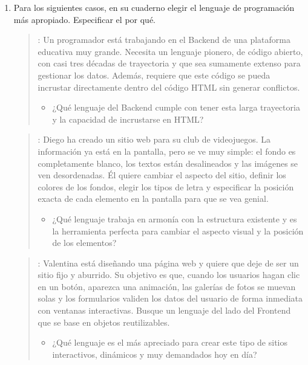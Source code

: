 \documentclass[letterpaper,10pt,spanish]{sphinxmanual}
\begin{document}
\begin{enumerate}
%
\setcounter{enumi}{7}
\item {} 
\sphinxAtStartPar
Para los siguientes casos, en su cuaderno elegir el lenguaje de programación más apropiado. Especificar el por qué.
\begin{quote}

\sphinxAtStartPar
{}: Un programador está trabajando en el Back\sphinxhyphen{}end de una plataforma educativa muy grande. Necesita un lenguaje pionero, de código abierto, con casi tres décadas de trayectoria y que sea sumamente extenso para gestionar los datos. Además, requiere que este código se pueda incrustar directamente dentro del código HTML sin generar conflictos.
\begin{itemize}
\item {} 
\sphinxAtStartPar
¿Qué lenguaje del Back\sphinxhyphen{}end cumple con tener esta larga trayectoria y la capacidad de incrustarse en HTML?

\end{itemize}
\end{quote}
\begin{quote}

\sphinxAtStartPar
{}: Diego ha creado un sitio web para su club de videojuegos. La información ya está en la pantalla, pero se ve muy simple: el fondo es completamente blanco, los textos están desalineados y las imágenes se ven desordenadas. Él quiere cambiar el aspecto del sitio, definir los colores de los fondos, elegir los tipos de letra y especificar la posición exacta de cada elemento en la pantalla para que se vea genial.
\begin{itemize}
\item {} 
\sphinxAtStartPar
¿Qué lenguaje trabaja en armonía con la estructura existente y es la herramienta perfecta para cambiar el aspecto visual y la posición de los elementos?

\end{itemize}
\end{quote}
\begin{quote}

\sphinxAtStartPar
{}: Valentina está diseñando una página web y quiere que deje de ser un sitio fijo y aburrido. Su objetivo es que, cuando los usuarios hagan clic en un botón, aparezca una animación, las galerías de fotos se muevan solas y los formularios validen los datos del usuario de forma inmediata con ventanas interactivas. Busque un lenguaje del lado del Front\sphinxhyphen{}end que se base en objetos reutilizables.
\begin{itemize}
\item {} 
\sphinxAtStartPar
¿Qué lenguaje es el más apreciado para crear este tipo de sitios interactivos, dinámicos y muy demandados hoy en día?


\end{itemize}
\end{quote}
\end{enumerate}
\end{document}
